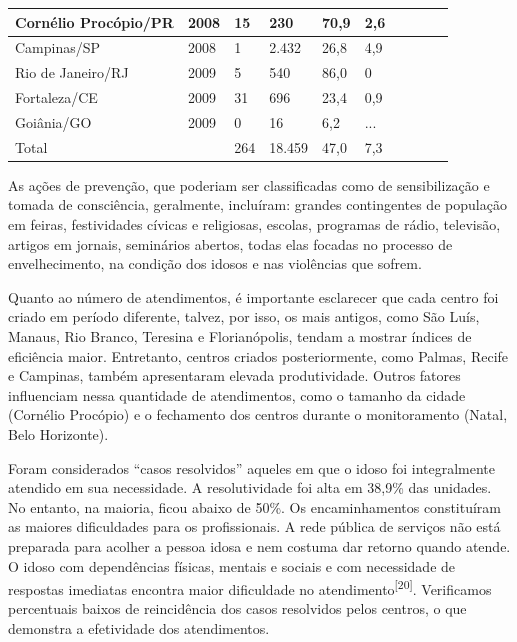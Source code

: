 \documentclass{article}
\begin{document}
\begin{table}
\begin{xtabular}{ l | l | l | l | l | l | l | l | l | l }
Cornélio Procópio/PR
& 2008
& 15
& 230
& 70,9
& 2,6
\\ \hline

Campinas/SP
& 2008
& 1
& 2.432
& 26,8
& 4,9
\\ \hline

Rio de Janeiro/RJ
& 2009
& 5
& 540
& 86,0
& 0
\\ \hline

Fortaleza/CE
& 2009
& 31
& 696
& 23,4
& 0,9
\\ \hline

Goiânia/GO
& 2009
& 0
& 16
& 6,2
& ...
\\ \hline

Total
&
& 264
& 18.459
& 47,0
& 7,3
\\ \hline

\end{xtabular}
\end{table}

As ações de prevenção, que poderiam ser classificadas como de sensibilização e
tomada de consciência, geralmente, incluíram: grandes contingentes de população
em feiras, festividades cívicas e religiosas, escolas, programas de rádio,
televisão, artigos em jornais, seminários abertos, todas elas focadas no
processo de envelhecimento, na condição dos idosos e nas violências que sofrem.

Quanto ao número de atendimentos, é importante esclarecer que cada centro foi
criado em período diferente, talvez, por isso, os mais antigos, como São Luís,
Manaus, Rio Branco, Teresina e Florianópolis, tendam a mostrar índices de
eficiência maior. Entretanto, centros criados posteriormente, como Palmas,
Recife e Campinas, também apresentaram elevada produtividade. Outros fatores
influenciam nessa quantidade de atendimentos, como o tamanho da cidade (Cornélio
Procópio) e o fechamento dos centros durante o monitoramento (Natal, Belo
Horizonte).

Foram considerados “casos resolvidos” aqueles em que o idoso foi integralmente
atendido em sua necessidade. A resolutividade foi alta em 38,9\% das unidades.
No entanto, na maioria, ficou abaixo de 50\%. Os encaminhamentos constituíram as
maiores dificuldades para os profissionais. A rede pública de serviços não está
preparada para acolher a pessoa idosa e nem costuma dar retorno quando atende. O
idoso com dependências físicas, mentais e sociais e com necessidade de respostas
imediatas encontra maior dificuldade no
atendimento\textsuperscript{[}\textsuperscript{20}\textsuperscript{]}. Verificamos percentuais baixos de reincidência dos casos resolvidos pelos
centros, o que demonstra a efetividade dos atendimentos.
\end{document}
